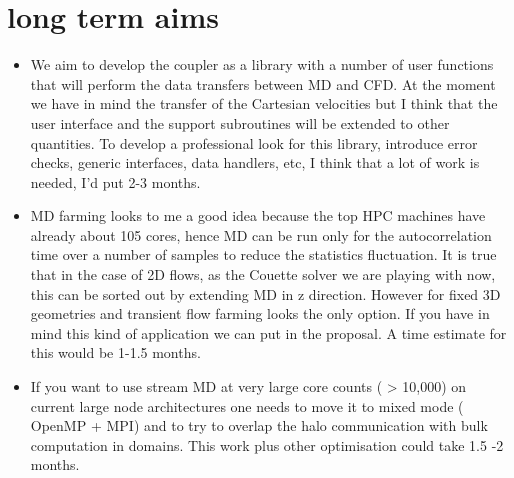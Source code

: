 \documentclass[a4paper,10pt]{article}
\numberwithin{equation}{section}
\numberwithin{figure}{section}
\begin{document}
\section{long term aims}
\begin{itemize}
 \item We aim to develop the coupler as a library  with a number of user functions that will perform the data transfers between MD and CFD. At the moment we  have in mind the transfer of the Cartesian velocities but I think that the user interface and the support subroutines will be extended to other quantities. To develop a professional look for this library, introduce  error checks, generic interfaces, data handlers, etc,  I think that a lot of  work is needed, I'd put 2-3 months.
 \item MD farming looks to me a good idea because the top HPC machines have already about 105 cores, hence MD
 can be run only for the autocorrelation time over a number of samples to reduce the statistics fluctuation. It is true that in the case of 2D  flows, as the Couette solver we are playing with now, this can be sorted out by extending MD in z direction. However for fixed 3D geometries and transient flow farming looks the only option. If you have in mind this kind of application we can put in the proposal.
A time estimate for this would be 1-1.5 months.
 \item If you want to use stream MD at very large core counts ( > 10,000) on current large node architectures one needs to move it to mixed mode ( OpenMP + MPI) and to try to overlap the halo communication with bulk computation in domains. This work plus other optimisation could take 1.5 -2 months.
\end{itemize}



\end{document}
